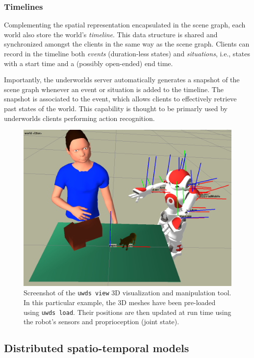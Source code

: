 \documentclass[letterpaper, 10 pt, conference]{ieeeconf}  %
\newcommand{\ie}{i.e.,\xspace}
\newcommand{\uwds}{{\sc underworlds}\xspace}
\begin{document}
\subsubsection{Timelines}

Complementing the spatial representation encapsulated in the scene graph, each
world also store the world's \emph{timeline}. This data structure is shared
and synchronized amongst the clients in the same way as the scene graph.
Clients can record in the timeline both \emph{events} (duration-less states) and
\emph{situations}, \ie states with a start time and a (possibly open-ended) end time.

Importantly, the \uwds server automatically generates a snapshot of
the scene graph whenever an event or situation is added to the timeline. The
snapshot is associated to the event, which allows clients to effectively retrieve past
states of the world. This capability is thought to be primarly used by \uwds clients
performing action recognition.

\begin{figure}
    \centering
    \includegraphics[width=\linewidth]{uwds-screenshot}
    \caption{Screenshot of the {\tt uwds view} 3D visualization and manipulation
    tool. In this particular example, the 3D meshes have been pre-loaded using
    {\tt uwds load}. Their positions are then updated at run time using the
    robot's sensors and proprioception (joint state).}
    \label{fig|uwds-view}
\end{figure}

\subsection{Distributed spatio-temporal models}
\label{arch}
\end{document}
